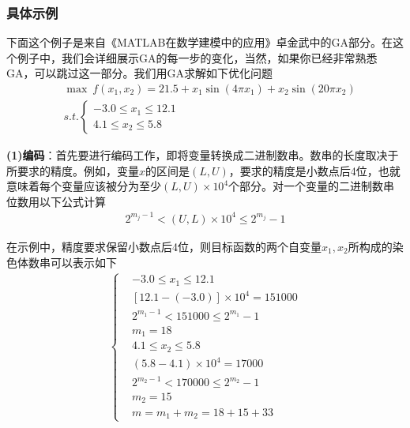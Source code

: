         \subsubsection{具体示例}
            \par
            下面这个例子是来自《MATLAB在数学建模中的应用》卓金武中的GA部分。在这个例子中，我们会详细展示GA的每一步的变化，当然，如果你已经非常熟悉GA，可以跳过这一部分。我们用GA求解如下优化问题
            \begin{align*}
            & \max \ f(x_1,x_2) = 21.5+x_1\sin(4\pi x_1)+x_2\sin (20\pi x_2)\\
            & s.t.\left\{
            \begin{aligned}
            -3.0 \leqslant x_1 \leqslant 12.1\\
            4.1 \leqslant x_2 \leqslant 5.8
            \end{aligned}
            \right.
            \end{align*}
            \par
            \textbf{(1)编码}：首先要进行编码工作，即将变量转换成二进制数串。数串的长度取决于所要求的精度。例如，变量$x$的区间是$(L,U)$，要求的精度是小数点后4位，也就意味着每个变量应该被分为至少$(L,U)\times 10^4$个部分。对一个变量的二进制数串位数用以下公式计算
            \begin{align*}
            2^{m_j-1} < (U,L)\times 10^4 \leqslant 2^{m_j} - 1
            \end{align*}
            \par
            在示例中，精度要求保留小数点后4位，则目标函数的两个自变量$x_1,x_2$所构成的染色体数串可以表示如下
            \begin{align*}
            \left\{
            \begin{aligned}
            & -3.0 \leqslant x_1 \leqslant 12.1\\
            & [12.1 -(-3.0)]\times 10^4 = 151000\\
            & 2^{m_1-1} < 151000 \leqslant 2^{m_1}-1\\
            & m_1 = 18\\
            & 4.1 \leqslant x_2 \leqslant 5.8\\
            & (5.8-4.1 )\times 10^4=17000\\
            & 2^{m_2-1} < 170000 \leqslant 2^{m_2}-1\\
            & m_2=15\\
            & m=m_1+m_2=18+15+33
            \end{aligned}
            \right.
            \end{align*}
